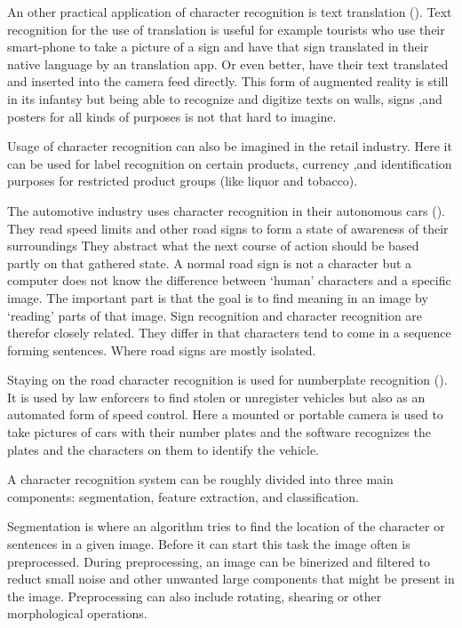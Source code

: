 An other practical application of character recognition is text translation (\cite{Chen2015}). Text recognition for the use of translation is useful for example tourists who use their smart-phone to take a picture of a sign and have that sign translated in their native language by an translation app. Or even better, have their text translated and inserted into the camera feed directly. This form of augmented reality is still in its infantsy but being able to recognize and digitize texts on walls, signs ,and posters for all kinds of purposes is not that hard to imagine. 

Usage of character recognition can also be imagined in the retail industry. Here it can be used for label recognition on certain products, currency ,and identification purposes for restricted product groups (like liquor and tobacco).

The automotive industry uses character recognition in their autonomous cars (\cite{sign}). They read speed limits and other road signs to form a state of awareness of their surroundings They abstract what the next course of action should be based partly on that gathered state. A normal road sign is not a character but a computer does not know the difference between `human' characters and a specific image. The important part is that the goal is to find meaning in an image by `reading' parts of that image. Sign recognition and character recognition are therefor closely related. They differ in that characters tend to come in a sequence forming sentences. Where road signs are mostly isolated.

Staying on the road character recognition is used for numberplate recognition (\cite{license-sota}). It is used by law enforcers to find stolen or unregister vehicles but also as an automated form of speed control. Here a mounted or portable camera is used to take pictures of cars with their number plates and the software recognizes the plates and the characters on them to identify the vehicle. 

A character recognition system can be roughly divided into three main components: segmentation, feature extraction, and classification.

Segmentation is where an algorithm tries to find the location of the character or sentences in a given image. Before it can start this task the image often is preprocessed. During preprocessing, an image can be binerized and filtered to reduct small noise and other unwanted large components that might be present in the image. Preprocessing can also include rotating, shearing or other morphological operations.

